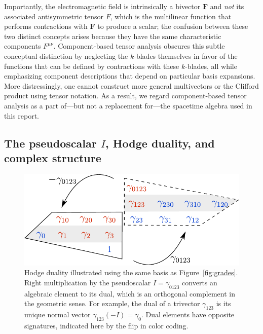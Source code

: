 \documentclass[1p,sort&compress]{elsarticle}
\numberwithin{equation}{section}
\newcommand{\bv}[1]{\mathbf{#1}}
\begin{document}
Importantly, the electromagnetic field is intrinsically a bivector $\bv{F}$ and \emph{not} its associated antisymmetric tensor $\underbar{F}$, which is the multilinear function that performs contractions with $\bv{F}$ to produce a scalar; the confusion between these two distinct concepts arises because they have the same characteristic components $F^{\mu\nu}$.  Component-based tensor analysis obscures this subtle conceptual distinction by neglecting the $k$-blades themselves in favor of the functions that can be defined by contractions with these $k$-blades, all while emphasizing component descriptions that depend on particular basis expansions.  More distressingly, one cannot construct more general multivectors or the Clifford product using tensor notation.  As a result, we regard component-based tensor analysis as a part of---but not a replacement for---the spacetime algebra used in this report.


\subsection{The pseudoscalar $I$, Hodge duality, and complex structure}\label{sec:complex}


\begin{figure}[t]
  \begin{center}
    \includegraphics[width=0.7\columnwidth]{Fig4.pdf}
  \end{center}
  \caption[Hodge duality]{Hodge duality illustrated using the same basis as Figure~\ref{fig:grades}.  Right multiplication by the pseudoscalar $I = \gamma_{0123}$ converts an algebraic element to its dual, which is an orthogonal complement in the geometric sense. For example, the dual of a trivector $\gamma_{123}$ is its unique normal vector $\gamma_{123}(-I) = \gamma_0$.  Dual elements have opposite signatures, indicated here by the flip in color coding.}
  \label{fig:dual1}
\end{figure}
\end{document}
